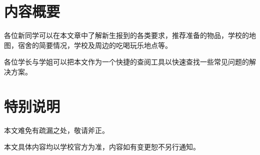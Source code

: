 \textbf{}

\section[内容概要]{内容概要}

各位新同学可以在本文章中了解新生报到的各类要求，推荐准备的物品，学校的地图，宿舍的简要情况，学校及周边的吃喝玩乐地点等。

各位学长与学姐可以把本文作为一个快捷的查阅工具以快速查找一些常见问题的解决方案。

\section[特别说明]{特别说明}
本文难免有疏漏之处，敬请斧正。

本文具体内容均以学校官方为准，内容如有变更恕不另行通知。